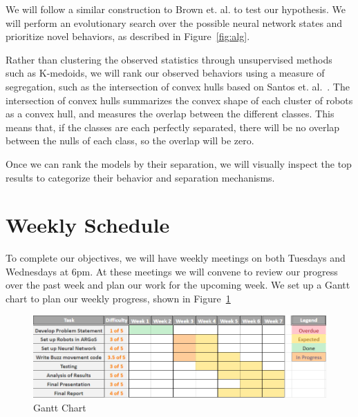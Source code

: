 \documentclass[conference]{IEEEtran}
\begin{document}
We will follow a similar construction to Brown et. al. to test our hypothesis. 
We will perform an evolutionary search over the possible neural network states and prioritize novel behaviors, as described in Figure~\ref{fig:alg}. 

Rather than clustering the observed statistics through unsupervised methods such as K-medoids, we will rank our observed behaviors using a measure of segregation, such as the intersection of convex hulls based on Santos et. al.~\cite{c6}.
The intersection of convex hulls summarizes the convex shape of each cluster of robots as a convex hull, and measures the overlap between the different classes.
This means that, if the classes are each perfectly separated, there will be no overlap between the nulls of each class, so the overlap will be zero. 

Once we can rank the models by their separation, we will visually inspect the top results to categorize their behavior and separation mechanisms. 

\section{Weekly Schedule}
To complete our objectives, we will have weekly meetings on both Tuesdays and Wednesdays at 6pm. At these meetings we will convene to review our progress over the past week and plan our work for the upcoming week. 
We set up a Gantt chart to plan our weekly progress, shown in Figure~\ref{fig:gantt_chart}
\begin{figure}
    \centering
    \includegraphics[width=\linewidth]{gantt_chart.PNG}
    \caption{Gantt Chart}
    \label{fig:gantt_chart}
\end{figure}



\end{document}
